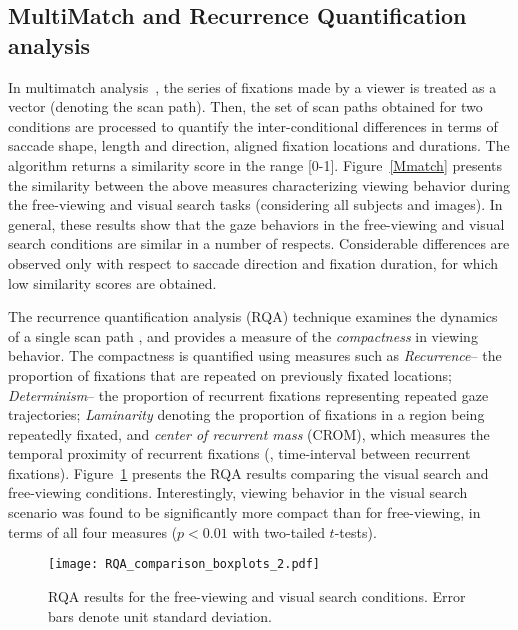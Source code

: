 \documentclass{article}
\begin{document}
\subsection{MultiMatch and Recurrence Quantification analysis}
In multimatch analysis~\cite{Dewhurst}, the series of fixations made by a viewer is treated as a vector (denoting the scan path). Then, the set of scan paths obtained for two conditions are processed to quantify the inter-conditional differences in terms of saccade shape, length and direction, aligned fixation locations and durations. The algorithm returns a similarity score in the range [0-1]. Figure~\ref{Mmatch} presents the similarity between the above measures characterizing viewing behavior during the free-viewing and visual search tasks (considering all subjects and images). In general, these results show that the gaze behaviors in the free-viewing and visual search conditions are similar in a number of respects. Considerable differences are observed only with respect to saccade direction and fixation duration, for which low similarity scores are obtained. 





The recurrence quantification analysis (RQA) technique examines the dynamics of a single scan path \cite{Anderson}, and provides a measure of the \textit{compactness} in viewing behavior. The compactness is quantified using measures such as \textit{Recurrence}-- the proportion of fixations that are repeated on previously fixated locations; \textit{Determinism}-- the proportion of recurrent fixations representing repeated gaze trajectories; \textit{Laminarity} denoting the proportion of fixations in a region being repeatedly fixated, and \textit{center of recurrent mass} (CROM), which measures the temporal proximity of recurrent fixations (\ie, time-interval between recurrent fixations). Figure~\ref{fig:RQA} presents the RQA results comparing the visual search and free-viewing conditions. Interestingly, viewing behavior in the visual search scenario was found to be significantly more compact than for free-viewing, in terms of all four measures ($p<0.01$ with two-tailed $t$-tests). 

\begin{figure}[htbp]
\texttt{[image: RQA\_comparison\_boxplots\_2.pdf]}\vspace{-0.02in}
\caption{RQA results for the free-viewing and visual search conditions. Error bars denote unit standard deviation.}
\label{fig:RQA}
\end{figure}
\end{document}
